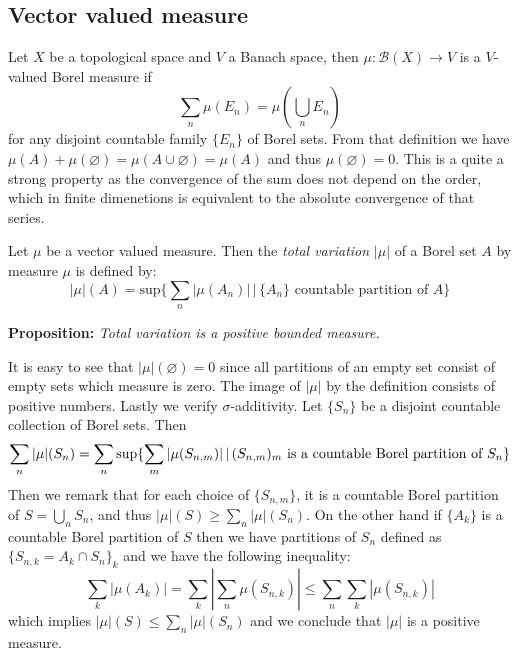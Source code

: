 \subsection{Vector valued measure}
Let $X$ be a topological space and $V$ a Banach space, then $\mu:\mathcal{B}(X)
\rightarrow V$ is a $V$-valued Borel measure if
\[\sum_n\mu(E_n)=\mu(\bigcup_n E_n)\]
for any disjoint countable family $\{E_n\}$ of Borel sets. From that definition
we have $\mu(A)+\mu(\varnothing)=\mu(A\cup\varnothing)=\mu(A)$ and thus 
$\mu(\varnothing)=0$. This is a quite a strong property as the convergence of
the sum does not depend on the order, which in finite dimenetions is equivalent
to the absolute convergence of that series.

\vspace{1ex} Let $\mu$ be a vector valued measure. Then the \emph{total
variation} $|\mu|$ of a Borel set $A$  by measure $\mu$ is defined by:
\[|\mu|(A) = \text{sup}\{\sum_n|\mu(A_n)|\,|\,\{A_n\}\text{ countable partition of }A\}\]

\textbf{Proposition:} \textit{Total variation is a positive bounded measure.}

\vspace{1ex}
It is easy to see that $|\mu|(\varnothing)=0$ since all partitions of an empty
set consist of empty sets which measure is zero. The image of $|\mu|$ by the
definition consists of positive numbers. Lastly we verify $\sigma$-additivity.
Let $\{S_n\}$ be a disjoint countable collection of Borel sets. Then
\[ 
    \sum_n|\mu|(S_n) = \sum_n\sup\{\sum_m|\mu(S_{n,m})|\,|\,(S_{n,m})_m\text{ is a countable Borel partition of }S_n\} \\ 
\]
Then we remark that for each choice of $\{S_{n,m}\}$, it is a countable Borel
partition of $S=\bigcup_n S_n$, and thus $|\mu|(S)\geq\sum_n|\mu|(S_n)$. On the
other hand if $\{A_k\}$ is a countable Borel partition of $S$ then we have
partitions of $S_n$ defined as $\{S_{n,k}=A_k\cap S_n\}_k$ and we have the
following inequality:
\[
    \sum_k|\mu(A_k)|=\sum_k|\sum_n\mu(S_{n,k})|\leq\sum_n\sum_k|\mu(S_{n,k})|
\]
which implies $|\mu|(S)\leq\sum_n|\mu|(S_n)$ and we conclude that $|\mu|$ is a
positive measure.

